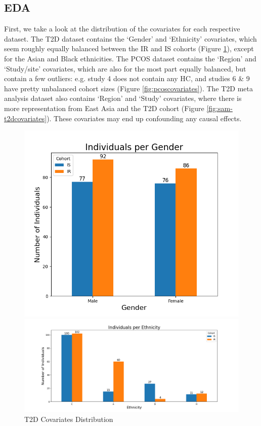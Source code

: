 \documentclass[12pt,letterpaper]{article}
\begin{document}
\subsection{EDA}

First, we take a look at the distribution of the covariates for each respective dataset. The T2D dataset contains the ‘Gender’ and ‘Ethnicity’ covariates, which seem roughly equally balanced between the IR and IS cohorts (Figure \ref{fig:t2dcovariates}), except for the Asian and Black ethnicities. The PCOS dataset contains the ‘Region’ and ‘Study/site’ covariates, which are also for the most part equally balanced, but contain a few outliers: e.g. study 4 does not contain any HC, and studies 6 \& 9 have pretty unbalanced cohort sizes (Figure \ref{fig:pcoscovariates}). The T2D meta analysis dataset also contains `Region' and `Study' covariates, where there is more representation from East Asia and the T2D cohort (Figure \ref{fig:sam-t2dcovariates}). These covariates may end up confounding any causal effects. 

\begin{figure}[h!]
\begin{minipage}{0.34\linewidth}
  \centering
  \includegraphics[width=\linewidth]{../plots/t2d/Gender_bar_chart.png}
\end{minipage}%
\begin{minipage}{0.66\linewidth}
   \centering
   \includegraphics[width=\linewidth]{../plots/t2d/Ethnicity_bar_chart.png}
\end{minipage}
\caption{T2D Covariates Distribution}
\label{fig:t2dcovariates}
\end{figure}
\end{document}
